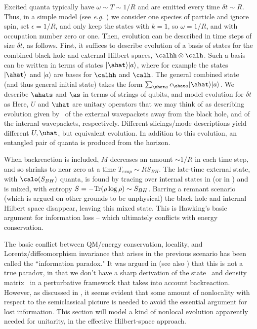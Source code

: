 Excited quanta typically have $\omega\sim T\sim 1/R$ and are emitted every time $\delta t\sim R$.  Thus, in a simple model (see {\it e.g.} \Mathurrev) we consider one species of particle and ignore spin, set $\epsilon=1/R$, and only keep the states with $k=1$, so $\omega=1/R$, and with occupation number zero or one.  Then, evolution can be described in time steps of size $\delta t$, as follows.  First, it suffices to describe evolution of a basis of states for the combined black hole and external Hilbert spaces, $\calhh\otimes\calh$.  Such a basis can be written in terms of states $|\ahat\rangle|a\rangle$, where for example the states $|\ahat\rangle$ and $|a\rangle$ are bases for $\calhh$ and $\calh$.   The general combined state (and thus general initial state) takes the form $\sum_{\ahat a} c_{\ahat a} |\ahat\rangle|a\rangle$.  We describe $\ahats$ and $\as$ in terms of strings of qubits, and model evolution for $\delta t$ as
%
\eqn{}
%
Here, $U$ and $\uhat$ are unitary operators that we may think of as describing evolution given by \hamil\ of the external wavepackets away from the black hole, and of the internal wavepackets, respectively.  Different slicings/mode descriptions yield different $U,\uhat$, but equivalent evolution.  In addition to this evolution, an entangled pair of quanta is produced from the horizon.

When backreaction is included, $M$ decreases an amount $\sim 1/R$ in each time step, and so shrinks to near zero at a time $T_{evap}\sim RS_{BH}$.  The late-time external state, with $\calo(S_{BH})$ quanta, is found by tracing over internal states in \paircreate (or in \hawkstate)
%
\eqn{}
%
and  is mixed, with entropy $S=-{\rm Tr}(\rho\log\rho) \sim S_{BH}$. Barring a remnant scenario (which is argued on other grounds to be unphysical) the black hole and internal Hilbert space disappear, leaving this mixed state.  This is Hawking's basic argument for information loss -- which ultimately conflicts with energy conservation.



The basic conflict between QM/energy conservation, locality, and Lorentz/diffe\-omorph\-ism invariance that arises in the previous scenario has been called the ``information paradox."  It was argued in  (see also ) that this is not a true paradox, in that we don't have a sharp derivation of the state \hawkstate\ and density matrix \rhoout\ in a perturbative framework that takes into account backreaction.  However, as discussed in , it seems evident that some amount of nonlocality with respect to the semiclassical picture is needed to avoid the essential argument for lost information.  This section will model a kind of nonlocal evolution apparently needed for unitarity, in the effective Hilbert-space approach.

